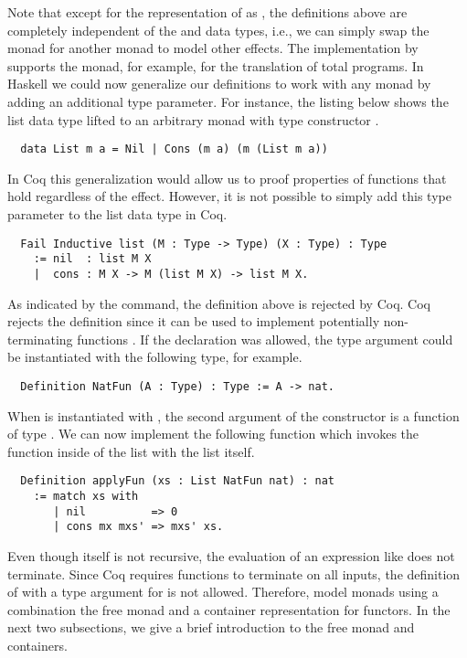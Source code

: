 Note that except for the representation of  as , the definitions above are completely independent of the  and  data types, i.e., we can simply swap the  monad for another monad to model other effects.
The implementation by \cite{Jessen:2019} supports the  monad, for example, for the translation of total programs.
In Haskell we could now generalize our definitions to work with any monad by adding an additional type parameter.
For instance, the listing below shows the list data type lifted to an arbitrary monad with type constructor .

\begin{verbatim}
  data List m a = Nil | Cons (m a) (m (List m a))
\end{verbatim}

In Coq this generalization would allow us to proof properties of functions that hold regardless of the effect.
However, it is not possible to simply add this type parameter to the list data type in Coq.

\begin{verbatim}
  Fail Inductive list (M : Type -> Type) (X : Type) : Type
    := nil  : list M X
    |  cons : M X -> M (list M X) -> list M X.
\end{verbatim}

As indicated by the  command, the definition above is rejected by Coq.
Coq rejects the definition since it can be used to implement potentially non-terminating functions \citep[p.~6]{Dylus:2018}.
If the declaration was allowed, the type argument  could be instantiated with the following type, for example.

\begin{verbatim}
  Definition NatFun (A : Type) : Type := A -> nat.
\end{verbatim}

When  is instantiated with , the second argument of the  constructor is a function of type .
We can now implement the following function which invokes the function inside of the list with the list itself.

\begin{verbatim}
  Definition applyFun (xs : List NatFun nat) : nat
    := match xs with
       | nil          => 0
       | cons mx mxs' => mxs' xs.
\end{verbatim}

Even though  itself is not recursive, the evaluation of an expression like  does not terminate.
Since Coq requires functions to terminate on all inputs, the definition of  with a type argument for  is not allowed.
Therefore, \citep{Dylus:2018} model monads using a combination the free monad and a container representation for functors.
In the next two subsections, we give a brief introduction to the free monad and containers.

